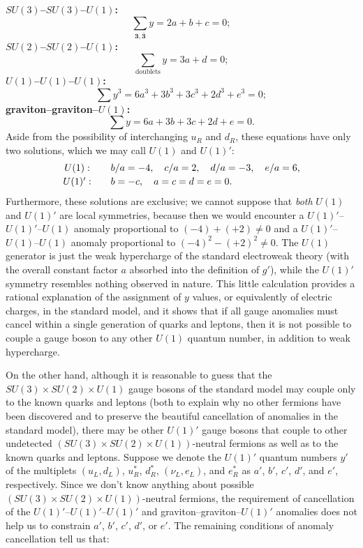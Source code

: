 \noindent\textbf{\boldmath$SU(3)$--$SU(3)$--$U(1)$:}
\[
 \sum_{\mathbf3,\overline{\mathbf3}}y=2a+b+c=0;
\]
\noindent\textbf{\boldmath$SU(2)$--$SU(2)$--$U(1)$:}
\[
 \sum_{\text{doublets}}y=3a+d=0;
\]
\noindent\textbf{\boldmath$U(1)$--$U(1)$--$U(1)$:}
\[
 \sum y^3=6a^3+3b^3+3c^3+2d^3+e^3=0;
\]
\noindent\textbf{graviton--graviton--\boldmath$U(1)$:}
\[
 \sum y=6a+3b+3c+2d+e=0.
\]
Aside from the possibility of interchanging $u_R$ and $d_R$, these
equations have only two solutions, which we may call $U(1)$ and $U(1)'$:
\[
 \begin{array}{c@{\qquad}l}
 U(1):&
 b/a=-4,\quad c/a=2,\quad d/a=-3,\quad e/a=6,\\[2pt]
 U(1)':&
 b=-c,\quad a=c=d=e=0.
 \end{array}
\]
Furthermore, these solutions are exclusive; we cannot suppose that
\emph{both} $U(1)$ and $U(1)'$ are local symmetries, because then we would
encounter a $U(1)'$--$U(1)'$--$U(1)$ anomaly proportional to
$(-4)+(+2)\neq0$ and a $U(1)'$--$U(1)$--$U(1)$ anomaly proportional to
$(-4)^2-(+2)^2\neq0$. The $U(1)$ generator is just the weak hypercharge of
the standard electroweak theory (with the overall constant factor $a$
absorbed into the definition of $g'$), while the $U(1)'$ symmetry resembles
nothing observed in nature. This little calculation provides a rational
explanation of the assignment of $y$ values, or equivalently of electric
charges, in the standard model, and it shows that if all gauge anomalies
must cancel within a single generation of quarks and leptons, then it is
not possible to couple a gauge boson to any other $U(1)$ quantum number,
in addition to weak hypercharge.

On the other hand, although it is reasonable to guess that the
$SU(3)\times SU(2)\times U(1)$ gauge bosons of the standard model may couple
only to the known quarks and leptons (both to explain why no other fermions
have been discovered and to preserve the beautiful cancellation of
anomalies in the standard model), there may be other $U(1)'$ gauge bosons
that couple to other undetected $(SU(3)\times SU(2)\times U(1))$-neutral
fermions as well as to the known quarks and leptons. Suppose we denote the
$U(1)'$ quantum numbers $y'$ of the multiplets $(u_L,d_L)$, $u_R^*$,
$d_R^*$, $(\nu_L,e_L)$, and $e_R^*$ as $a'$, $b'$, $c'$, $d'$, and $e'$,
respectively. Since we don't know anything about possible
$(SU(3)\times SU(2)\times U(1))$-neutral fermions, the requirement of
cancellation of the $U(1)'$--$U(1)'$--$U(1)'$ and
graviton--graviton--$U(1)'$ anomalies does not help us to constrain $a'$,
$b'$, $c'$, $d'$, or $e'$. The remaining conditions of anomaly
cancellation tell us that:

